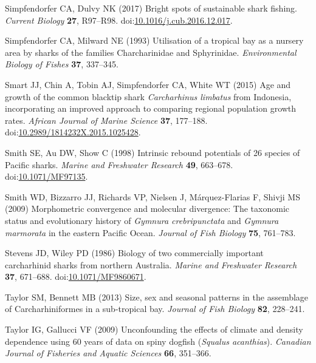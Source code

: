 \documentclass[]{article}
\begin{document}
\hypertarget{ref-simpfendorfer_bright_2017}{}
Simpfendorfer CA, Dulvy NK (2017) Bright spots of sustainable shark
fishing. \emph{Current Biology} \textbf{27}, R97--R98.
doi:\href{https://doi.org/10.1016/j.cub.2016.12.017}{10.1016/j.cub.2016.12.017}.

\hypertarget{ref-simpfendorfer_utilisation_1993}{}
Simpfendorfer CA, Milward NE (1993) Utilisation of a tropical bay as a
nursery area by sharks of the families Charcharinidae and Sphyrinidae.
\emph{Environmental Biology of Fishes} \textbf{37}, 337--345.

\hypertarget{ref-smart_age_2015}{}
Smart JJ, Chin A, Tobin AJ, Simpfendorfer CA, White WT (2015) Age and
growth of the common blacktip shark \emph{Carcharhinus limbatus} from
Indonesia, incorporating an improved approach to comparing regional
population growth rates. \emph{African Journal of Marine Science}
\textbf{37}, 177--188.
doi:\href{https://doi.org/10.2989/1814232X.2015.1025428}{10.2989/1814232X.2015.1025428}.

\hypertarget{ref-smith_intrinsic_1998}{}
Smith SE, Au DW, Show C (1998) Intrinsic rebound potentials of 26
species of Pacific sharks. \emph{Marine and Freshwater Research}
\textbf{49}, 663--678.
doi:\href{https://doi.org/10.1071/MF97135}{10.1071/MF97135}.

\hypertarget{ref-smith_morphometric_2009}{}
Smith WD, Bizzarro JJ, Richards VP, Nielsen J, Márquez-Flarias F, Shivji
MS (2009) Morphometric convergence and molecular divergence: The
taxonomic status and evolutionary history of \emph{Gymnura
crebripunctata} and \emph{Gymnura marmorata} in the eastern Pacific
Ocean. \emph{Journal of Fish Biology} \textbf{75}, 761--783.

\hypertarget{ref-stevens_biology_1986}{}
Stevens JD, Wiley PD (1986) Biology of two commercially important
carcharhinid sharks from northern Australia. \emph{Marine and Freshwater
Research} \textbf{37}, 671--688.
doi:\href{https://doi.org/10.1071/MF9860671}{10.1071/MF9860671}.

\hypertarget{ref-taylor_size_2013}{}
Taylor SM, Bennett MB (2013) Size, sex and seasonal patterns in the
assemblage of Carcharhiniformes in a sub-tropical bay. \emph{Journal of
Fish Biology} \textbf{82}, 228--241.

\hypertarget{ref-taylor_unconfounding_2009}{}
Taylor IG, Gallucci VF (2009) Unconfounding the effects of climate and
density dependence using 60 years of data on spiny dogfish
(\emph{Squalus acanthias}). \emph{Canadian Journal of Fisheries and
Aquatic Sciences} \textbf{66}, 351--366.
\end{document}
